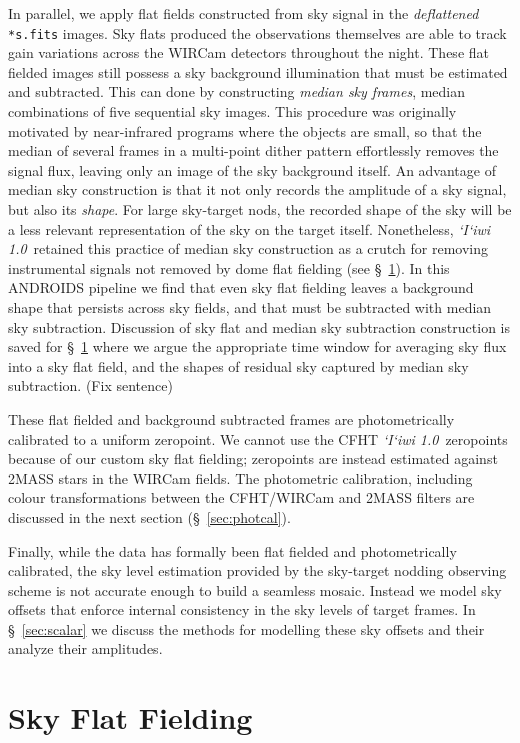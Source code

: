 \documentclass[iop]{emulateapj}
\newcommand{\sw}[1]{\textit{#1}} %
\newcommand{\iiwione}{\sw{`I`iwi 1.0}}
\newcommand{\todo}[1]{\textcolor{RedOrange}{#1}} %
\begin{document}
In parallel, we apply flat fields constructed from sky signal in the \textit{deflattened} \texttt{*s.fits} images.
Sky flats produced the observations themselves are able to track gain variations across the WIRCam detectors throughout the night.
These flat fielded images still possess a sky background illumination that must be estimated and subtracted.
This can done by constructing \textit{median sky frames}, median combinations of five sequential sky 
images.
This procedure was originally motivated by near-infrared programs where the objects are small, so that the median of several frames in a multi-point dither pattern effortlessly removes the signal flux, leaving only an image of the sky background itself.
An advantage of median sky construction is that it not only records the amplitude of a sky signal, but also its \emph{shape}.
For large sky-target nods, the recorded shape of the sky will be a less relevant representation of the sky on the target itself.
Nonetheless, \iiwione\ retained this practice of median sky construction as a crutch for removing instrumental signals not removed by dome flat fielding (see \S~\ref{sec:flats}). In this ANDROIDS pipeline we find that even sky flat fielding leaves a background shape that persists across sky fields, and that must be subtracted with median sky subtraction.
Discussion of sky flat and median sky subtraction construction is saved for \S~\ref{sec:flats} where we argue the appropriate time window for averaging sky flux into a sky flat field, and the shapes of residual sky captured by median sky subtraction. \todo{(Fix sentence)}

These flat fielded and background subtracted frames are photometrically calibrated to a uniform zeropoint.
We cannot use the CFHT \iiwione\ zeropoints because of our custom sky flat fielding; zeropoints are instead estimated against 2MASS stars in the WIRCam fields.
The photometric calibration, including colour transformations between the CFHT/WIRCam and 2MASS filters are discussed in the next section (\S~\ref{sec:photcal}).

Finally, while the data has formally been flat fielded and photometrically calibrated, the sky level estimation provided by the sky-target nodding observing scheme is not accurate enough to build a seamless mosaic.
Instead we model sky offsets that enforce internal consistency in the sky levels of target frames.
In \S~\ref{sec:scalar} we discuss the methods for modelling these sky offsets and their analyze their amplitudes.

\section{Sky Flat Fielding}
\label{sec:flats}
\end{document}
